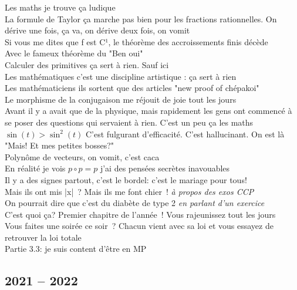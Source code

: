 \documentclass[french, a4paper, openany]{book}
\begin{document}
	\noindent \og Les maths je trouve ça ludique \fg \\
	\og La formule de Taylor ça marche pas bien pour les fractions rationnelles. On dérive une fois, ça va, on dérive deux fois, on vomit \fg \\
	\og Si vous me dites que f est C¹, le théorème des accroissements finis décède \fg \\
	\og Avec le fameux théorème du "Ben oui" \fg \\
	\og Calculer des primitives ça sert à rien. Sauf ici \fg \\
	\og Les mathématiques c'est une discipline artistique : ça sert à rien \fg \\
	\og Les mathématiciens ils sortent que des articles "new proof of chépakoi" \fg \\
	\og Le morphisme de la conjugaison me réjouit de joie tout les jours \fg \\
	\og Avant il y a avait que de la physique, mais rapidement les gens ont commencé à se poser des questions qui servaient à rien. C'est un peu ça les maths \fg \\
	$\sin(t) > \sin^2(t)$ \og C'est fulgurant d'efficacité. C'est hallucinant. On est là "Mais! Et mes petites bosses?" \fg \\
	\og Polynôme de vecteurs, on vomit, c'est caca \fg \\
	\og En réalité je vois $p \circ p = p$ j'ai des pensées secrètes inavouables \fg \\
	\og Il y a des signes partout, c'est le bordel: c'est le mariage pour tous! \fg \\
	\og Mais ils ont mis |x|~? Mais ils me font chier~! \fg \emph{à propos des exos CCP} \\
	\og On pourrait dire que c'est du diabète de type 2 \fg \emph{en parlant d'un exercice} \\
	\og C'est quoi ça? Premier chapitre de l'année~! Vous rajeunissez tout les jours \fg \\
	\og Vous faites une soirée ce soir~? Chacun vient avec sa loi et vous essayez de retrouver la loi totale \fg \\
	\og Partie 3.3: je suis content d'être en MP \fg \\

	\subsection*{2021 -- 2022}
\end{document}
